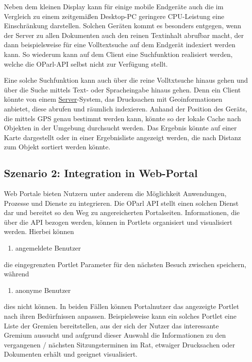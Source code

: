 \documentclass[,a4paper]{article}
\begin{document}
Neben dem kleinen Display kann für einige mobile Endgeräte auch die im
Vergleich zu einem zeitgemäßen Desktop-PC geringere CPU-Leistung eine
Einschränkung darstellen. Solchen Geräten kommt es besonders entgegen,
wenn der Server zu allen Dokumenten auch den reinen Textinhalt abrufbar
macht, der dann beispielsweise für eine Volltextsuche auf dem Endgerät
indexiert werden kann. So wiederum kann auf dem Client eine Suchfunktion
realisiert werden, welche die OParl-API selbst nicht zur Verfügung
stellt.

Eine solche Suchfunktion kann auch über die reine Volltxtsuche hinaus
gehen und über die Suche mittels Text- oder Spracheingabe hinaus gehen.
Denn ein Client könnte von einem \hyperref[server]{Server}-System, das
Drucksachen mit Geoinformationen anbietet, diese abrufen und räumlich
indexieren. Anhand der Position des Geräts, die mittels GPS genau
bestimmt werden kann, könnte so der lokale Cache nach Objekten in der
Umgebung durchsucht werden. Das Ergebnis könnte auf einer Karte
dargestellt oder in einer Ergebnisliste angezeigt werden, die nach
Distanz zum Objekt sortiert werden könnte.

\subsection{Szenario 2: Integration in
Web-Portal}\label{szenarioux5fwebux5fportal}

Web Portale bieten Nutzern unter anderem die Möglichkeit Anwendungen,
Prozesse und Dienste zu integrieren. Die OParl API stellt einen solchen
Dienst dar und bereitet so den Weg zu angereicherten Portalseiten.
Informationen, die über die API bezogen werden, können in Portlets
organisiert und visualisiert werden. Hierbei können

\begin{enumerate}
\def\labelenumi{\arabic{enumi}.}
\itemsep1pt\parskip0pt
\item
  angemeldete Benutzer
\end{enumerate}

die eingegrenzten Portlet Parameter für den nächsten Besuch zwischen
speichern, während

\begin{enumerate}
\def\labelenumi{\arabic{enumi}.}
\setcounter{enumi}{1}
\itemsep1pt\parskip0pt
\item
  anonyme Benutzer
\end{enumerate}

dies nicht können. In beiden Fällen können Portalnutzer das angezeigte
Portlet nach ihren Bedürfnissen anpassen. Beispielsweise kann ein
solches Portlet eine Liste der Gremien bereitstellen, aus der sich der
Nutzer das interessante Gremium aussucht und aufgrund dieser Auswahl die
Informationen zu den vergangenen / nächsten Sitzungsterminen im Rat,
etwaiger Drucksachen oder Dokumenten erhält und geeignet visualisiert.
\end{document}
